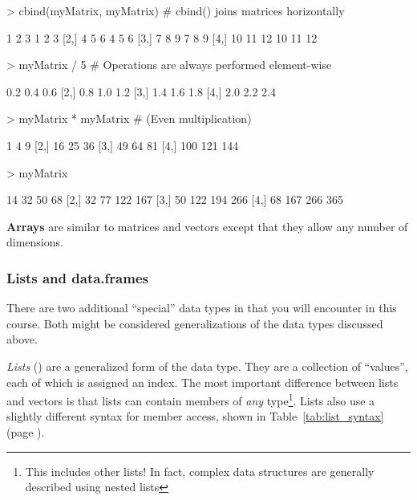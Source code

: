 \documentclass[10pt,letterpaper]{article}
\begin{document}
\begin{Schunk}
\begin{Sinput}
> cbind(myMatrix, myMatrix)       # cbind() joins matrices horizontally
\end{Sinput}
\begin{Soutput}
     [,1] [,2] [,3] [,4] [,5] [,6]
[1,]    1    2    3    1    2    3
[2,]    4    5    6    4    5    6
[3,]    7    8    9    7    8    9
[4,]   10   11   12   10   11   12
\end{Soutput}
\begin{Sinput}
> myMatrix / 5                    # Operations are always performed element-wise
\end{Sinput}
\begin{Soutput}
     [,1] [,2] [,3]
[1,]  0.2  0.4  0.6
[2,]  0.8  1.0  1.2
[3,]  1.4  1.6  1.8
[4,]  2.0  2.2  2.4
\end{Soutput}
\begin{Sinput}
> myMatrix * myMatrix             # (Even multiplication)
\end{Sinput}
\begin{Soutput}
     [,1] [,2] [,3]
[1,]    1    4    9
[2,]   16   25   36
[3,]   49   64   81
[4,]  100  121  144
\end{Soutput}
\begin{Sinput}
> myMatrix %*% t(myMatrix)        # unless the %*% notation is used
\end{Sinput}
\begin{Soutput}
     [,1] [,2] [,3] [,4]
[1,]   14   32   50   68
[2,]   32   77  122  167
[3,]   50  122  194  266
[4,]   68  167  266  365
\end{Soutput}
\end{Schunk}


\textbf{Arrays} are similar to matrices and vectors except that they allow any number of dimensions.

\subsubsection{Lists and data.frames} %
\label{ssub:lists_and_data_frames}

There are two additional ``special'' data types in \R that you will encounter in this course.  Both might be considered generalizations of the data types discussed above.

\emph{Lists} () are a generalized form of the  data type.  They are a collection of ``values'', each of which is assigned an index.  The most important difference between lists and vectors is that lists can contain members of \emph{any} type\footnote{This includes other lists!  In fact, complex data structures are generally described using nested lists}.  Lists also use a slightly different syntax for member access, shown in Table~\ref{tab:list_syntax} (page \pageref{tab:list_syntax}).
\end{document}
